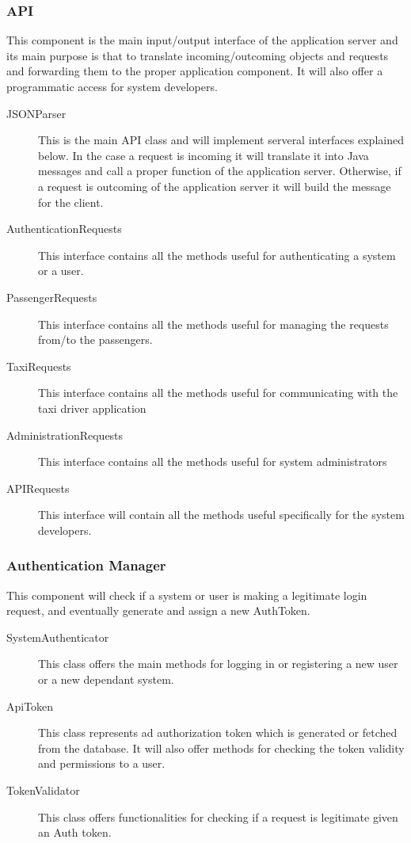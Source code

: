 \documentclass[11pt, a4paper,titlepage]{article}
\begin{document}
 \subsubsection{API}
	 This component is the main input/output interface of the application server and its main purpose is that to translate incoming/outcoming objects and requests and forwarding them to the proper application component. It will also offer a programmatic access for system developers. 
	 \begin{description}
	 	\item[JSONParser] This is the main API class and will implement serveral interfaces explained below. In the case a request is incoming it will translate it into Java messages and call a proper function of the application server. Otherwise, if a request is outcoming of the application server it will build the message for the client.
	 	\item[AuthenticationRequests] This interface contains all the methods useful for authenticating a system or a user.
	 	\item[PassengerRequests] This interface contains all the methods useful for managing the requests from/to the passengers. 
	 	\item[TaxiRequests] This interface contains all the methods useful for communicating with the taxi driver application
	 	\item[AdministrationRequests] This interface contains all the methods useful for system administrators
	 	\item[APIRequests] This interface will contain all the methods useful specifically for the system developers.
	 \end{description}
 \subsubsection{Authentication Manager}
	 This component will check if a system or user is making a legitimate login request, and eventually generate and assign a new AuthToken.
	 \begin{description}
	 	\item[SystemAuthenticator] This class offers the main methods for logging in or registering a new user or a new dependant system.
	 	\item[ApiToken] This class represents ad authorization token which is generated or fetched from the database. It will also offer methods for checking the token validity and permissions to a user.
	 	\item[TokenValidator] This class offers functionalities for checking if a request is legitimate given an Auth token.
	 \end{description}
\end{document}

